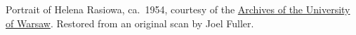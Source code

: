 Portrait of Helena Rasiowa, ca.~1954, courtesy of the
\href{http://www.archiwum.uw.edu.pl/}{Archives of the University
of Warsaw}.  Restored from an original scan by Joel Fuller.
